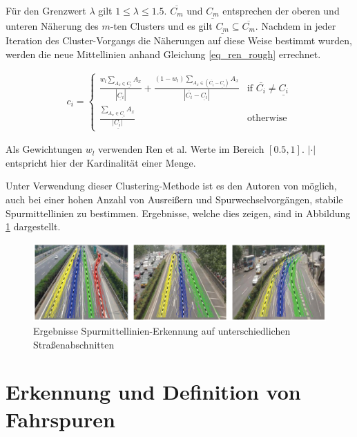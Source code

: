 Für den Grenzwert $\lambda$ gilt $1 \leq \lambda \leq 1.5$. $\overline{C_m}$ und $\underline{C_m}$ entsprechen der oberen und unteren
Näherung des $m$-ten Clusters und es gilt $\underline{C_m} \subseteq \overline{C_m}$.
Nachdem in jeder Iteration des Cluster-Vorgangs die Näherungen auf diese Weise bestimmt wurden, werden die neue Mittellinien
anhand Gleichung \ref{eq_ren_rough} errechnet.

\begin{ceqn}
\begin{align}
    \label{eq_ren_rough}
    c_i =
    \begin{cases}
        \frac{w_l \sum_{A_x \in \underline{C_i}} A_x}{|\underline{C_i}|} + \frac{(1 - w_l) \sum_{A_x \in (\overline{C_i} - \underline{C_i})} A_x}{|\overline{C_i} - \underline{C_i}|} & \text{if } \overline{C_i} \neq \underline{C_i} \\
        \frac{\sum_{A_x \in \underline{C_i}} A_x}{|\underline{C_i|}} & \text{otherwise}
    \end{cases}
\end{align}
\end{ceqn}

Als Gewichtungen $w_l$ verwenden Ren et al. Werte im Bereich $[0.5, 1]$. $| \cdot |$ entspricht hier der Kardinalität einer Menge.

Unter Verwendung dieser Clustering-Methode ist es den Autoren von \cite[]{Ren2014} möglich, auch bei einer hohen Anzahl von
Ausreißern und Spurwechselvorgängen, stabile Spurmittellinien zu bestimmen. Ergebnisse, welche dies zeigen, sind in Abbildung
\ref{fig:relw_ren_example_detection} dargestellt.

\begin{figure}[H]
    \centering
    \includegraphics[width=0.95\linewidth]{resources/img/RelatedWork/ren_examples_detection}
    \caption[Ergebnisse Spurmittellinien-Erkennung (Ren et al.)]
            {Ergebnisse Spurmittellinien-Erkennung auf unterschiedlichen Straßenabschnitten \cite[]{Ren2014}}
    \label{fig:relw_ren_example_detection}
\end{figure}


\section{Erkennung und Definition von Fahrspuren}
\label{sec:rw_lane_detection}

